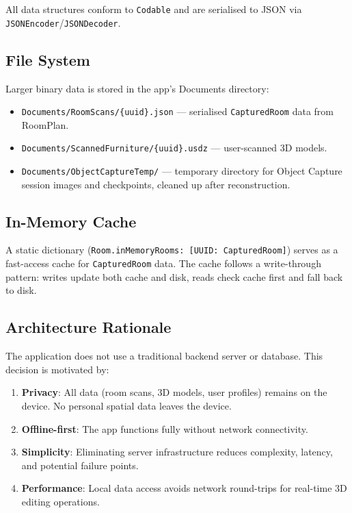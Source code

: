 All data structures conform to \texttt{Codable} and are serialised to JSON via \texttt{JSONEncoder}/\texttt{JSONDecoder}.

\subsection{File System}

Larger binary data is stored in the app's Documents directory:

\begin{itemize}
    \item \texttt{Documents/RoomScans/\{uuid\}.json} — serialised \texttt{CapturedRoom} data from RoomPlan.
    \item \texttt{Documents/ScannedFurniture/\{uuid\}.usdz} — user-scanned 3D models.
    \item \texttt{Documents/ObjectCaptureTemp/} — temporary directory for Object Capture session images and checkpoints, cleaned up after reconstruction.
\end{itemize}

\subsection{In-Memory Cache}

A static dictionary (\texttt{Room.inMemoryRooms: [UUID: CapturedRoom]}) serves as a fast-access cache for \texttt{CapturedRoom} data. The cache follows a write-through pattern: writes update both cache and disk, reads check cache first and fall back to disk.

\subsection{Architecture Rationale}

The application does not use a traditional backend server or database. This decision is motivated by:

\begin{enumerate}
    \item \textbf{Privacy}: All data (room scans, 3D models, user profiles) remains on the device. No personal spatial data leaves the device.
    \item \textbf{Offline-first}: The app functions fully without network connectivity.
    \item \textbf{Simplicity}: Eliminating server infrastructure reduces complexity, latency, and potential failure points.
    \item \textbf{Performance}: Local data access avoids network round-trips for real-time 3D editing operations.
\end{enumerate}


